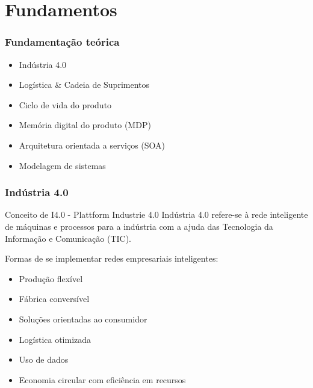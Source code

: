 \documentclass[10pt]{beamer}
\begin{document}
\iffalse
\section{Fundamentos}

\begin{frame}
	\frametitle{Fundamentação teórica}

	\begin{itemize}
		\item Indústria 4.0
		\item Logística \& Cadeia de Suprimentos
		\item Ciclo de vida do produto
		\item Memória digital do produto (MDP)
		\item Arquitetura orientada a serviços (SOA)
		\item Modelagem de sistemas
	\end{itemize}

\end{frame}
\begin{frame}
	\frametitle{Indústria 4.0}
	
	\begin{block}{Conceito de I4.0 - Plattform Industrie 4.0 }
		Indústria 4.0 refere-se à rede inteligente de máquinas e processos para a indústria com a ajuda das Tecnologia da Informação e Comunicação (TIC).
	\end{block}

	Formas de se implementar redes empresariais inteligentes:
	
	\begin{itemize}
		\item Produção flexível
		\item Fábrica conversível
		\item Soluções orientadas ao consumidor
		\item Logística otimizada
		\item Uso de dados
		\item Economia circular com eficiência em recursos
	\end{itemize}
	
\end{frame}
\end{document}
